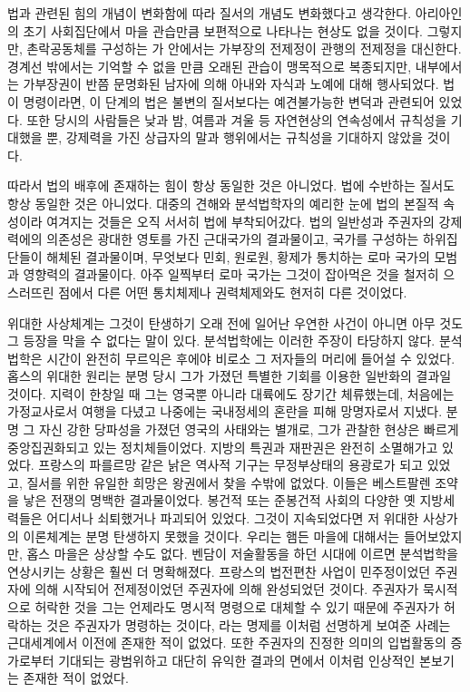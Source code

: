 법과 관련된 힘의 개념이 변화함에 따라
질서의 개념도 변화했다고 생각한다.
아리아인의 초기 사회집단에서
마을 관습만큼 보편적으로 나타나는 현상도 없을 것이다.
그렇지만, 촌락공동체를 구성하는 가 안에서는
가부장의 전제정이
관행의 전제정을 대신한다.
경계선 밖에서는 기억할 수 없을 만큼 오래된 관습이 맹목적으로 복종되지만,
내부에서는
가부장권이
반쯤 문명화된 남자에 의해
아내와 자식과 노예에 대해 행사되었다.
법이 명령이라면,
이 단계의 법은 불변의 질서보다는 예견불가능한 변덕과 관련되어 있었다.
또한
당시의 사람들은
낮과 밤, 여름과 겨울 등
자연현상의 연속성에서
규칙성을 기대했을 뿐,
강제력을 가진 상급자의 말과 행위에서는 규칙성을 기대하지 않았을 것이다.

따라서 법의 배후에 존재하는 힘이 항상 동일한 것은 아니었다.
법에 수반하는 질서도 항상 동일한 것은 아니었다.
대중의 견해와 분석법학자의 예리한 눈에
법의 본질적 속성이라 여겨지는 것들은 오직 서서히 법에 부착되어갔다.
법의 일반성과 주권자의 강제력에의 의존성은
광대한 영토를 가진 근대국가의 결과물이고,
국가를 구성하는 하위집단들이 해체된 결과물이며,
무엇보다 민회, 원로원, 황제가 통치하는 로마 국가의 모범과 영향력의 결과물이다.
아주 일찍부터
로마 국가는
그것이 잡아먹은 것을 철저히 으스러뜨린 점에서
다른 어떤 통치체제나 권력체제와도 현저히 다른 것이었다.

위대한 사상체계는
그것이 탄생하기 오래 전에 일어난
우연한 사건이 아니면
아무 것도 그 등장을 막을 수 없다는 말이 있다.
분석법학에는
이러한 주장이
타당하지 않다.
분석법학은 시간이 완전히 무르익은 후에야 비로소 그 저자들의 머리에
들어설 수 있었다.
홉스의 위대한 원리는 분명
당시 그가 가졌던 특별한 기회를 이용한 일반화의 결과일 것이다.
지력이 한창일 때 그는 영국뿐 아니라 대륙에도 장기간 체류했는데,
처음에는 가정교사로서 여행을 다녔고
나중에는 국내정세의 혼란을 피해 망명자로서 지냈다.
분명 그 자신 강한 당파성을 가졌던 영국의 사태와는 별개로,
그가 관찰한 현상은 빠르게 중앙집권화되고 있는 정치체들이었다.
지방의 특권과 재판권은 완전히 소멸해가고 있었다.
프랑스의 파를르망 같은 낡은 역사적 기구는
무정부상태의 용광로가 되고 있었고,
질서를 위한 유일한 희망은 왕권에서 찾을 수밖에 없었다.
이들은 베스트팔렌 조약을 낳은 전쟁의 명백한 결과물이었다.
봉건적 또는 준봉건적 사회의 다양한 옛 지방세력들은
어디서나 쇠퇴했거나 파괴되어 있었다.
그것이 지속되었다면 저 위대한 사상가의 이론체계는 분명
탄생하지 못했을 것이다.
우리는 햄든 마을에 대해서는 들어보았지만,
홉스 마을은 상상할 수도 없다.
벤담이 저술활동을 하던 시대에 이르면
분석법학을 연상시키는 상황은 훨씬 더 명확해졌다.
프랑스의 법전편찬 사업이
민주정이었던 주권자에 의해 시작되어
전제정이었던 주권자에 의해 완성되었던 것이다.
주권자가 묵시적으로 허락한 것을
그는 언제라도 명시적 명령으로 대체할 수 있기 때문에
주권자가 허락하는 것은 주권자가 명령하는 것이다, 라는 명제를
이처럼 선명하게 보여준 사례는 근대세계에서
이전에 존재한 적이 없었다.
또한 주권자의 진정한 의미의 입법활동의 증가로부터 기대되는
광범위하고 대단히 유익한 결과의 면에서
이처럼 인상적인 본보기는 존재한 적이 없었다.

